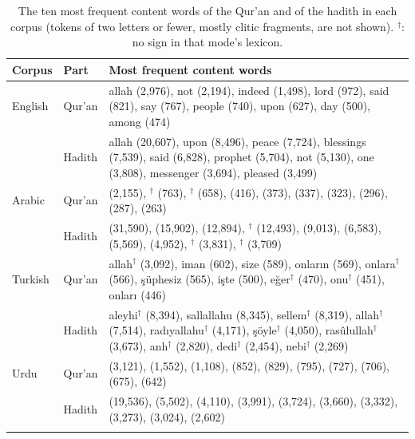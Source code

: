 \begin{table}[ht]
\centering\small
\caption{The ten most frequent content words of the Qur'an and of the hadith in each corpus (tokens of two
letters or fewer, mostly clitic fragments, are not shown). $^\dagger$: no sign in that mode's lexicon.}
\label{tab:eda_top}
\begin{tabularx}{\textwidth}{l l Y}
\toprule
Corpus & Part & Most frequent content words \\
\midrule
English & Qur'an & allah (2,976), not (2,194), indeed (1,498), lord (972), said (821), say (767), people (740), upon (627), day (500), among (474) \\
 & Hadith & allah (20,607), upon (8,496), peace (7,724), blessings (7,539), said (6,828), prophet (5,704), not (5,130), one (3,808), messenger (3,694), pleased (3,499) \\
\addlinespace
Arabic & Qur'an &  (2,155), $^\dagger$ (763), $^\dagger$ (658),  (416),  (373),  (337),  (323),  (296),  (287),  (263) \\
 & Hadith &  (31,590),  (15,902),  (12,894), $^\dagger$ (12,493),  (9,013),  (6,583),  (5,569),  (4,952), $^\dagger$ (3,831), $^\dagger$ (3,709) \\
\addlinespace
Turkish & Qur'an & allah$^\dagger$ (3,092), iman (602), size (589), onların (569), onlara$^\dagger$ (566), şüphesiz (565), işte (500), eğer$^\dagger$ (470), onu$^\dagger$ (451), onları (446) \\
 & Hadith & aleyhi$^\dagger$ (8,394), sallallahu (8,345), sellem$^\dagger$ (8,319), allah$^\dagger$ (7,514), radıyallahu$^\dagger$ (4,171), şöyle$^\dagger$ (4,050), rasûlullah$^\dagger$ (3,673), anh$^\dagger$ (2,820), dedi$^\dagger$ (2,454), nebi$^\dagger$ (2,269) \\
\addlinespace
Urdu & Qur'an &  (3,121),  (1,552),  (1,108),  (852),  (829),  (795),  (727),  (706),  (675),  (642) \\
 & Hadith &  (19,536),  (5,502),  (4,110),  (3,991),  (3,724),  (3,660),  (3,332),  (3,273),  (3,024),  (2,602) \\
\addlinespace
\bottomrule
\end{tabularx}
\end{table}

